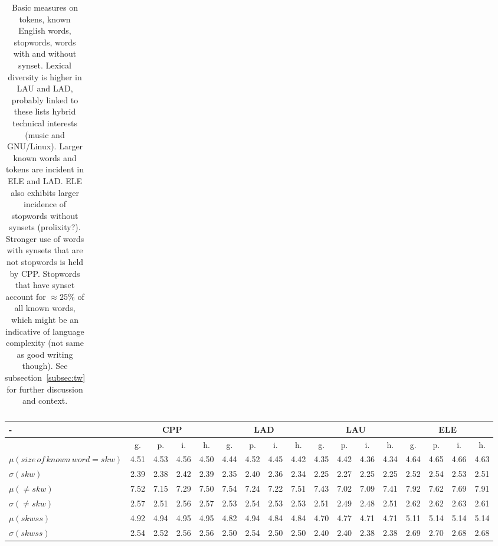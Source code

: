 \documentclass[%
 aip,
 jmp,%
 amsmath,amssymb,
 reprint,%
 floatfix,
]{revtex4-1}
\begin{document}
\begin{table}
\begin{tabular}{|l|| c|c|c|c||  c|c|c|c||   c|c|c|c||   c|c|c|c|}
  \end{tabular}
  \caption{Basic measures on tokens, known English words, stopwords, words with and without synset. Lexical diversity is higher in LAU and LAD, probably linked to these lists hybrid technical interests (music and GNU/Linux). Larger known words and tokens are incident in ELE and LAD. ELE also exhibits larger incidence of stopwords without synsets (prolixity?). Stronger use of words with synsets that are not stopwords is held by CPP. Stopwords that have synset account for $\approx25\%$ of all known words, which might be an indicative of language complexity (not same as good writing though). See subsection~\ref{subsec:tw} for further discussion and context.}
  \label{tab:tokens}
\end{table}

\begin{table}
\footnotesize
\setlength{\tabcolsep}{.56667em}
  \centering
  \begin{tabular}{|l|| c|c|c|c||  c|c|c|c||   c|c|c|c||   c|c|c|c|}\hline
-\-  & \multicolumn{4}{c|}{CPP} & \multicolumn{4}{c|}{LAD} & \multicolumn{4}{c|}{LAU} & \multicolumn{4}{c|}{ELE} \\ \hline
 & g. & p. & i. & h. &     g. & p. & i. & h. &    g. & p. & i. & h. &    g. & p. & i. & h. \\\hline
$\mu(size\,of\,known\,word=skw)$ & 4.51 & 4.53 & 4.56 & 4.50 & 4.44 & 4.52 & 4.45 & 4.42 & 4.35 & 4.42 & 4.36 & 4.34 & 4.64 & 4.65 & 4.66 & 4.63 \\
$\sigma(skw)$ & 2.39 & 2.38 & 2.42 & 2.39 & 2.35 & 2.40 & 2.36 & 2.34 & 2.25 & 2.27 & 2.25 & 2.25 & 2.52 & 2.54 & 2.53 & 2.51 \\
$\mu(\neq skw)$ & 7.52 & 7.15 & 7.29 & 7.50 & 7.54 & 7.24 & 7.22 & 7.51 & 7.43 & 7.02 & 7.09 & 7.41 & 7.92 & 7.62 & 7.69 & 7.91 \\
$\sigma(\neq skw)$ & 2.57 & 2.51 & 2.56 & 2.57 & 2.53 & 2.54 & 2.53 & 2.53 & 2.51 & 2.49 & 2.48 & 2.51 & 2.62 & 2.62 & 2.63 & 2.61 \\ \hline
$\mu(skwss)$ & 4.92 & 4.94 & 4.95 & 4.95 & 4.82 & 4.94 & 4.84 & 4.84 & 4.70 & 4.77 & 4.71 & 4.71 & 5.11 & 5.14 & 5.14 & 5.14 \\
$\sigma(skwss)$ & 2.54 & 2.52 & 2.56 & 2.56 & 2.50 & 2.54 & 2.50 & 2.50 & 2.40 & 2.40 & 2.38 & 2.38 & 2.69 & 2.70 & 2.68 & 2.68 \\

\end{tabular}
\end{table}
\end{document}
